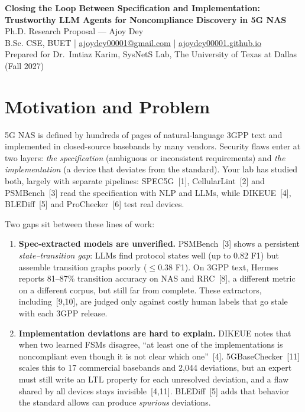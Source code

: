 \documentclass[11pt,letterpaper]{article}
\begin{document}
\begin{center}
{\Large\bfseries Closing the Loop Between Specification and Implementation:\\[2pt]
Trustworthy LLM Agents for Noncompliance Discovery in 5G NAS}\\[6pt]
{\normalsize Ph.D. Research Proposal --- Ajoy Dey}\\
{\small B.Sc. CSE, BUET \;|\; \href{mailto:ajoydey00001@gmail.com}{ajoydey00001@gmail.com} \;|\; \href{https://ajoydey00001.github.io/}{ajoydey00001.github.io}}\\
{\small Prepared for Dr.\ Imtiaz Karim, SysNetS Lab, The University of Texas at Dallas (Fall 2027)}
\end{center}

\section{Motivation and Problem}

5G NAS is defined by hundreds of pages of natural-language 3GPP text and implemented in closed-source basebands by many vendors. Security flaws enter at two layers: \emph{the specification} (ambiguous or inconsistent requirements) and \emph{the implementation} (a device that deviates from the standard). Your lab has studied both, largely with separate pipelines: SPEC5G~[1], CellularLint~[2] and PSMBench~[3] read the specification with NLP and LLMs, while DIKEUE~[4], BLEDiff~[5] and ProChecker~[6] test real devices.

Two gaps sit between these lines of work:
\begin{enumerate}
  \item \textbf{Spec-extracted models are unverified.} PSMBench~[3] shows a persistent \emph{state--transition gap}: LLMs find protocol states well (up to 0.82 F1) but assemble transition graphs poorly ($\le$0.38 F1). On 3GPP text, Hermes reports 81--87\% transition accuracy on NAS and RRC~[8], a different metric on a different corpus, but still far from complete. These extractors, including~[9,10], are judged only against costly human labels that go stale with each 3GPP release.
  \item \textbf{Implementation deviations are hard to explain.} DIKEUE notes that when two learned FSMs disagree, ``at least one of the implementations is noncompliant even though it is not clear which one''~[4]. 5GBaseChecker~[11] scales this to 17 commercial basebands and 2{,}044 deviations, but an expert must still write an LTL property for each unresolved deviation, and a flaw shared by all devices stays invisible~[4,11]. BLEDiff~[5] adds that behavior the standard allows can produce \emph{spurious} deviations.
\end{enumerate}
\end{document}
